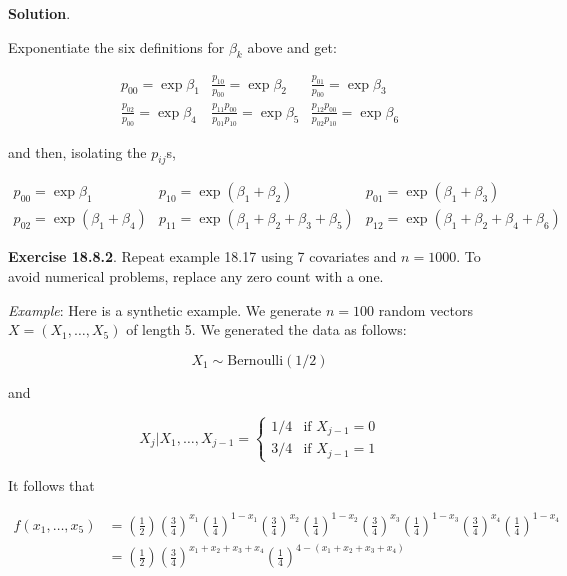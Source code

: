 \textbf{Solution}.

Exponentiate the six definitions for \(\beta_k\) above and get:

\[
\begin{array}{ccc}
p_{00} = \exp \beta_1 &
\frac{p_{10}}{p_{00}} = \exp \beta_2 &
\frac{p_{01}}{p_{00}} = \exp \beta_3 \\
\frac{p_{02}}{p_{00}} = \exp \beta_4 &
\frac{p_{11}p_{00}}{p_{01}p_{10}} = \exp \beta_5 &
\frac{p_{12}p_{00}}{p_{02}p_{10}} = \exp \beta_6
\end{array}
\]

and then, isolating the \(p_{ij}\)s,

\[
\begin{array}{ccc}
p_{00} = \exp \beta_1 &
p_{10} = \exp \left( \beta_1 + \beta_2 \right) &
p_{01} = \exp \left( \beta_1 + \beta_3 \right) \\
p_{02} = \exp \left( \beta_1 + \beta_4 \right) &
p_{11} = \exp \left( \beta_1 + \beta_2 + \beta_3 + \beta_5 \right) &
p_{12} = \exp \left( \beta_1 + \beta_2 + \beta_4 + \beta_6 \right)
\end{array}
\]

\textbf{Exercise 18.8.2}. Repeat example 18.17 using 7 covariates and
\(n = 1000\). To avoid numerical problems, replace any zero count with a
one.

\emph{Example}: Here is a synthetic example. We generate \(n = 100\)
random vectors \(X = (X_1, \dots, X_5)\) of length 5. We generated the
data as follows:

\[ X_1 \sim \text{Bernoulli}(1/2)\]

and

\[ X_j | X_1, \dots, X_{j-1} = \begin{cases}
1/4 & \text{if } X_{j-1} = 0 \\
3/4 & \text{if } X_{j-1} = 1
\end{cases}\]

It follows that

\[
\begin{align}
f(x_1, \dots, x_5) &= 
\left( \frac{1}{2} \right) \left( \frac{3}{4} \right)^{x_1} \left( \frac{1}{4} \right)^{1 - x_1} \left( \frac{3}{4} \right)^{x_2} \left( \frac{1}{4} \right)^{1 - x_2} \left( \frac{3}{4} \right)^{x_3} \left( \frac{1}{4} \right)^{1 - x_3} \left( \frac{3}{4} \right)^{x_4} \left( \frac{1}{4} \right)^{1 - x_4} \\
&= \left( \frac{1}{2} \right) \left( \frac{3}{4} \right)^{x_1 + x_2 + x_3 + x_4} \left( \frac{1}{4} \right)^{4 - (x_1 + x_2 + x_3 + x_4)} 
\end{align}
\]

